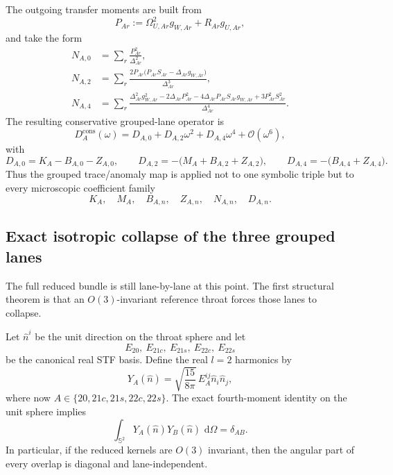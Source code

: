\documentclass[11pt]{article}
\theoremstyle{definition}
\newcommand{\dd}{\,\mathrm{d}}
\newcommand{\cO}{\mathcal O}
\newcommand{\bbS}{\mathbb S}
\begin{document}
The outgoing transfer moments are built from
\begin{equation}
P_{Ar}:=\Omega_{U,Ar}^2 g_{W,Ar}+R_{Ar}g_{U,Ar},
\label{eq:grouped-PAr}
\end{equation}
and take the form
\begin{align}
N_{A,0}
&=\sum_r \frac{P_{Ar}^2}{\Delta_{Ar}^2},
\nonumber\\
N_{A,2}
&=\sum_r \frac{2P_{Ar}\bigl(P_{Ar}S_{Ar}-\Delta_{Ar}g_{W,Ar}\bigr)}{\Delta_{Ar}^3},
\nonumber\\
N_{A,4}
&=\sum_r \frac{\Delta_{Ar}^2 g_{W,Ar}^2-2\Delta_{Ar}P_{Ar}^2-4\Delta_{Ar}P_{Ar}S_{Ar}g_{W,Ar}+3P_{Ar}^2S_{Ar}^2}{\Delta_{Ar}^4}.
\label{eq:grouped-N-moments}
\end{align}
The resulting conservative grouped-lane operator is
\begin{equation}
D_A^{\mathrm{cons}}(\omega)=D_{A,0}+D_{A,2}\omega^2+D_{A,4}\omega^4+\cO(\omega^6),
\label{eq:grouped-conservative-operator}
\end{equation}
with
\begin{equation}
D_{A,0}=K_A-B_{A,0}-Z_{A,0},
\qquad
D_{A,2}=-\bigl(M_A+B_{A,2}+Z_{A,2}\bigr),
\qquad
D_{A,4}=-\bigl(B_{A,4}+Z_{A,4}\bigr).
\label{eq:grouped-D-moments}
\end{equation}
Thus the grouped trace/anomaly map is applied not to one symbolic triple but to every microscopic coefficient family
\[
K_A,
\quad
M_A,
\quad
B_{A,n},
\quad
Z_{A,n},
\quad
N_{A,n},
\quad
D_{A,n}.
\]

\subsection{Exact isotropic collapse of the three grouped lanes}

The full reduced bundle is still lane-by-lane at this point. The first structural theorem is that an $O(3)$-invariant reference throat forces those lanes to collapse.

Let $\hat n^i$ be the unit direction on the throat sphere and let
\[
E_{20},\ E_{21c},\ E_{21s},\ E_{22c},\ E_{22s}
\]
be the canonical real STF basis. Define the real $l=2$ harmonics by
\begin{equation}
Y_A(\hat n)=\sqrt{\frac{15}{8\pi}}\,E_A^{ij}\hat n_i\hat n_j,
\label{eq:grouped-real-STF-harmonics}
\end{equation}
where now $A\in\{20,21c,21s,22c,22s\}$. The exact fourth-moment identity on the unit sphere implies
\begin{equation}
\int_{\bbS^2}Y_A(\hat n)Y_B(\hat n)\,\dd\Omega=\delta_{AB}.
\label{eq:grouped-STF-orthonormality}
\end{equation}
In particular, if the reduced kernels are $O(3)$ invariant, then the angular part of every overlap is diagonal and lane-independent.
\end{document}
